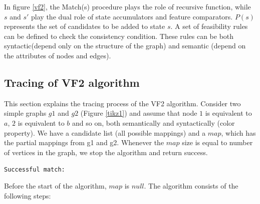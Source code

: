 In figure \ref{vf2}, the Match(s) procedure plays the role of recursive function, while $s$ and $s'$ play the dual role of state accumulators and feature comparators. $P(s)$ represents the set of candidates to be added to state $s$. A set of feasibility rules can be defined to check the consistency condition. These rules can be both syntactic(depend only on the structure of the graph) and semantic (depend on the attributes of nodes and edges).

\subsection{Tracing of VF2 algorithm}

This section explains the tracing process of the VF2 algorithm. Consider two simple graphs $g1$ and $g2$ (Figure \ref{tikz1}) and assume that node $1$ is equivalent to $a$, $2$ is equivalent to $b$ and so on, both semantically and syntactically (color property). We have a candidate list (all possible mappings) and a $map$, which has the partial mappings from g1 and g2. Whenever the $map$ size is equal to number of vertices in the graph, we stop the algorithm and return success.

\texttt{Successful match:}\\

    \label{tikz1}

Before the start of the algorithm, $map$ is $null$. The algorithm consists of the following steps:

